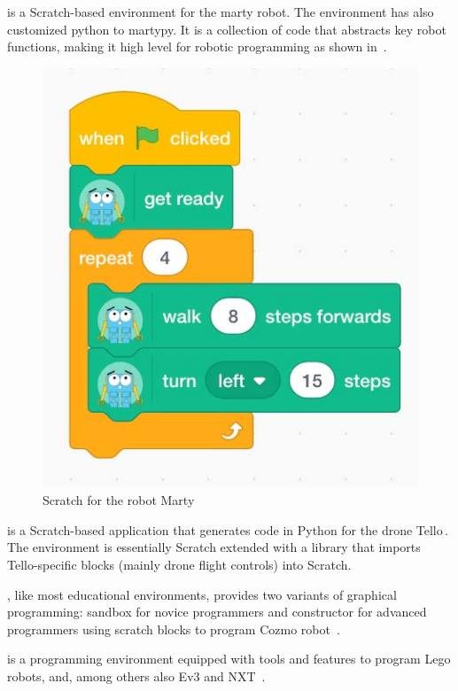 \parhead{\marty} is a Scratch-based environment for the marty robot. The environment has also customized python to martypy. It is a collection of code that abstracts key robot functions, making it high level for robotic programming as shown in \,\cite{Marty}. 

\begin{figure}[b]
     \centering
		\vspace{-.4cm}
    \includegraphics[width=.45\columnwidth]{ScratchMarty.jpg}
      \caption{Scratch for the robot Marty\,\cite{Marty} }
      \label{scratch-marty}
   \end{figure}

\parhead{\tello} is a Scratch-based application that generates code in Python for the drone Tello\,\cite{TelloEduApp}. %
 The environment is essentially Scratch extended with a library that imports Tello-specific blocks (mainly drone flight controls) into Scratch.

\parhead{\codelab}, like most educational environments, provides two variants of graphical programming: sandbox for novice programmers and constructor for advanced programmers using scratch blocks to program Cozmo robot~\cite{COZMO}.

\parhead{\lego} is a programming environment equipped with tools and features to program Lego robots, and, among others also Ev3 and NXT~\cite{LEGO,alternativeLEGO}. %


